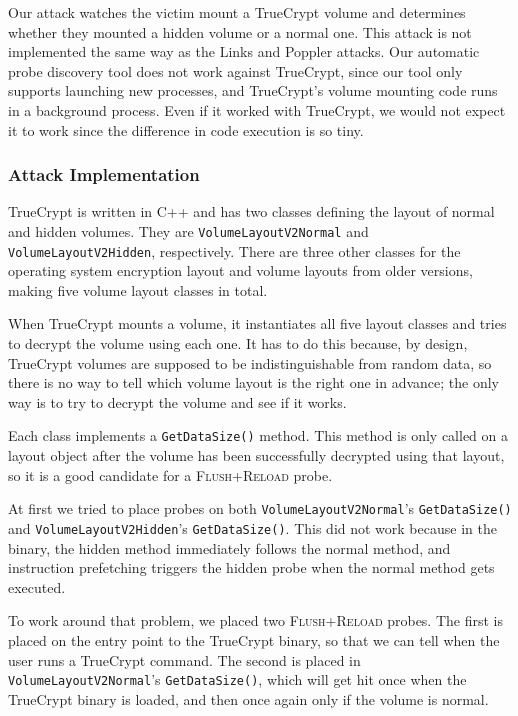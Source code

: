 \documentclass[letterpaper,twocolumn,10pt]{article}
\begin{document}
Our attack watches the victim mount a TrueCrypt volume and determines whether
they mounted a hidden volume or a normal one. This attack is not implemented the
same way as the Links and Poppler attacks. Our automatic probe discovery tool
does not work against TrueCrypt, since our tool only supports launching new
processes, and TrueCrypt's volume mounting code runs in a background process.
Even if it worked with TrueCrypt, we would not expect it to work since the
difference in code execution is so tiny.

\subsubsection{Attack Implementation}

TrueCrypt is written in C++ and has two classes defining the layout of normal
and hidden volumes. They are \texttt{VolumeLayout\-V2Normal} and
\texttt{VolumeLayout\-V2Hidden}, respectively. There are three other classes for
the operating system encryption layout and volume layouts from older versions,
making five volume layout classes in total.

When TrueCrypt mounts a volume, it instantiates all five layout classes and
tries to decrypt the volume using each one. It has to do this because, by
design, TrueCrypt volumes are supposed to be indistinguishable from random data,
so there is no way to tell which volume layout is the right one in advance; the
only way is to try to decrypt the volume and see if it works.

Each class implements a \texttt{GetDataSize()} method. This method is only
called on a layout object after the volume has been successfully decrypted using
that layout, so it is a good candidate for a \textsc{Flush+Reload} probe.

At first we tried to place probes on both \texttt{VolumeLayout\-V2Normal}'s
\texttt{GetDataSize()} and \texttt{VolumeLayout\-V2Hidden}'s
\texttt{GetDataSize()}. This did not work because in the binary, the hidden
method immediately follows the normal method, and instruction prefetching
triggers the hidden probe when the normal method gets executed.

To work around that problem, we placed two \textsc{Flush+Reload} probes. The
first is placed on the entry point to the TrueCrypt binary, so that we can tell
when the user runs a TrueCrypt command. The second is placed in
\texttt{VolumeLayout\-V2Normal}'s \texttt{GetDataSize()}, which will get hit
once when the TrueCrypt binary is loaded, and then once again only if the volume
is normal.
\end{document}
